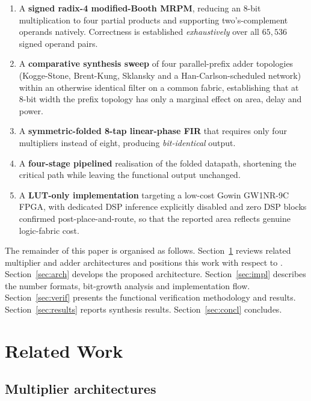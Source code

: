 \documentclass[conference]{IEEEtran}
\begin{document}
\begin{enumerate}
  \item A \textbf{signed radix-4 modified-Booth MRPM}, reducing an
  8-bit multiplication to four partial products and supporting
  two's-complement operands natively. Correctness is established
  \emph{exhaustively} over all $65{,}536$ signed operand pairs.

  \item A \textbf{comparative synthesis sweep} of four parallel-prefix
  adder topologies (Kogge-Stone, Brent-Kung, Sklansky and a
  Han-Carlson-scheduled network) within an otherwise identical filter on
  a common fabric, establishing that at 8-bit width the prefix topology
  has only a marginal effect on area, delay and power.

  \item A \textbf{symmetric-folded 8-tap linear-phase FIR} that
  requires only four multipliers instead of eight, producing
  \emph{bit-identical} output.

  \item A \textbf{four-stage pipelined} realisation of the folded
  datapath, shortening the critical path while leaving the functional
  output unchanged.

  \item A \textbf{LUT-only implementation} targeting a low-cost Gowin
  GW1NR-9C FPGA, with dedicated DSP inference explicitly disabled and
  zero DSP blocks confirmed post-place-and-route, so that the reported
  area reflects genuine logic-fabric cost.
\end{enumerate}

The remainder of this paper is organised as follows.
Section~\ref{sec:related} reviews related multiplier and adder
architectures and positions this work with respect to \cite{base}.
Section~\ref{sec:arch} develops the proposed architecture.
Section~\ref{sec:impl} describes the number formats, bit-growth
analysis and implementation flow. Section~\ref{sec:verif} presents the
functional verification methodology and results.
Section~\ref{sec:results} reports synthesis results.
Section~\ref{sec:concl} concludes.

\section{Related Work}
\label{sec:related}

\subsection{Multiplier architectures}
\end{document}
